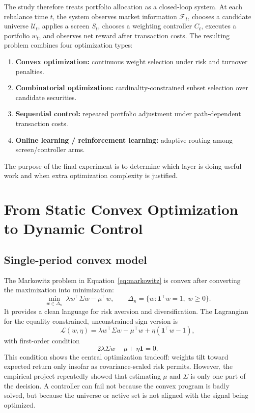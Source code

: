 \documentclass[11pt,a4paper]{article}
\newcommand{\one}{\mathbf{1}}
\begin{document}
The study therefore treats portfolio allocation as a closed-loop system. At each rebalance time $t$, the system observes market information $\mathcal{F}_t$, chooses a candidate universe $\mathcal{U}_t$, applies a screen $S_t$, chooses a weighting controller $C_t$, executes a portfolio $w_t$, and observes net reward after transaction costs. The resulting problem combines four optimization types:
\begin{enumerate}[leftmargin=1.5em]
    \item \textbf{Convex optimization:} continuous weight selection under risk and turnover penalties.
    \item \textbf{Combinatorial optimization:} cardinality-constrained subset selection over candidate securities.
    \item \textbf{Sequential control:} repeated portfolio adjustment under path-dependent transaction costs.
    \item \textbf{Online learning / reinforcement learning:} adaptive routing among screen/controller arms.
\end{enumerate}
The purpose of the final experiment is to determine which layer is doing useful work and when extra optimization complexity is justified.

\section{From Static Convex Optimization to Dynamic Control}
\subsection{Single-period convex model}
The Markowitz problem in Equation~\eqref{eq:markowitz} is convex after converting the maximization into minimization:
\begin{equation}
\min_{w\in\Delta_n}\; \lambda w^\top \Sigma w - \mu^\top w, \qquad \Delta_n=\{w:\one^\top w=1,\; w\ge0\}.
\end{equation}
It provides a clean language for risk aversion and diversification. The Lagrangian for the equality-constrained, unconstrained-sign version is
\begin{equation}
\mathcal{L}(w,\eta)=\lambda w^\top\Sigma w-\mu^\top w + \eta(\one^\top w-1),
\end{equation}
with first-order condition
\begin{equation}
2\lambda \Sigma w - \mu + \eta\one =0.
\end{equation}
This condition shows the central optimization tradeoff: weights tilt toward expected return only insofar as covariance-scaled risk permits. However, the empirical project repeatedly showed that estimating $\mu$ and $\Sigma$ is only one part of the decision. A controller can fail not because the convex program is badly solved, but because the universe or active set is not aligned with the signal being optimized.
\end{document}
